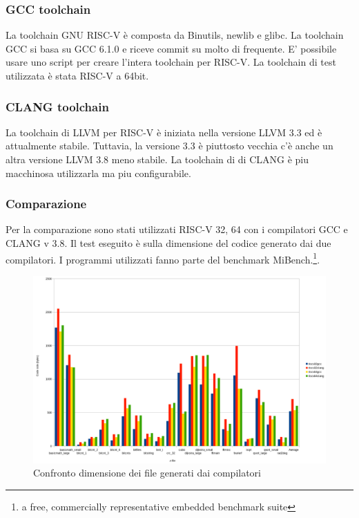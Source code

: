 \documentclass[12pt,a4paper]{report}
\begin{document}
\subsubsection{GCC toolchain}
La toolchain GNU RISC-V è composta da Binutils, newlib e glibc. La toolchain GCC si basa su GCC 6.1.0 e riceve commit su molto di frequente.  E' possibile usare uno script per creare l'intera toolchain per RISC-V. 
La toolchain di test utilizzata è stata RISC-V a 64bit.

\subsubsection{CLANG toolchain}
La toolchain di LLVM per RISC-V è iniziata nella versione LLVM 3.3 ed è attualmente stabile. Tuttavia, la versione 3.3 è piuttosto vecchia c'è anche un altra versione LLVM 3.8 meno stabile. La toolchain di di CLANG è piu macchinosa utilizzarla ma piu configurabile.  

\subsubsection{Comparazione}

Per la comparazione sono stati utilizzati RISC-V 32, 64 con i compilatori GCC e CLANG v 3.8. Il test eseguito è sulla dimensione del codice generato dai due compilatori. I programmi utilizzati fanno parte del benchmark MiBench.\footnote{a free, commercially representative embedded benchmark suite}.

\begin{figure}[h!]
	\centering
	\includegraphics[scale = 0.3]{CompilatoriGrafici/Compilatori_GCC_CLANG.png}
	\caption{Confronto dimensione dei file generati dai compilatori}
	\label{Fig:graficoSizeComparisionCompilatori}
\end{figure}
\end{document}

